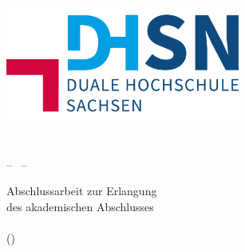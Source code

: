 \thispagestyle{empty}
\begin{titlepage}


	\vspace{1cm}
	\begin{center}
		\includegraphics[width=7.7cm]{figures/CD/DHSN-Logo} \\ 
	\end{center}

	\begin{center}
		\vspace{0.1cm}
		\huge \textbf{\myAcademy}\\
		\vspace{0.4cm}
		\LARGE -- \myStudy\ --
	\end{center}

	\vfill


	\vfill

	\begin{center}
		\LARGE \textbf{\myTitle}
		\ifdef{\mySubtitle}{\vspace{0.2cm}\\ \large \mySubtitle}{}
	\end{center} 

	\vfill
	\vfill

	\begin{center}
		\Large Abschlussarbeit zur Erlangung\\des akademischen Abschlusses\\
		\vspace{0.3cm}
		\Large\myDegree\\
		\small(\myDegreeShort)
	\end{center}


\end{titlepage}
